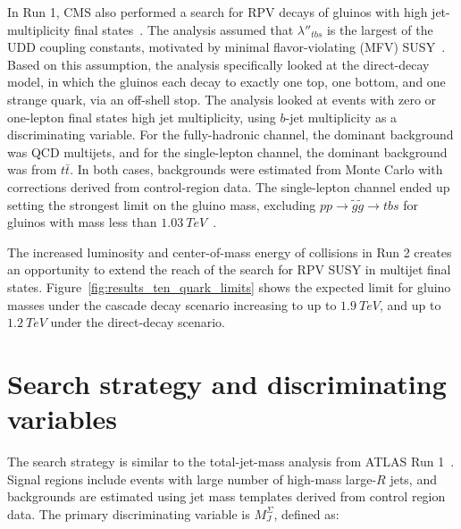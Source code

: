 In Run 1, CMS also performed a search for RPV decays of gluinos with high jet-multiplicity final states~\cite{analysis-cms-run1}.
The analysis assumed that $\lambda''_{tbs}$ is the largest of the UDD coupling constants, motivated by minimal flavor-violating (MFV) SUSY~\cite{susy-mfv}.
Based on this assumption, the analysis specifically looked at the direct-decay model, in which the gluinos each decay to exactly one top, one bottom, and one strange quark, via an off-shell stop.
The analysis looked at events with zero or one-lepton final states high jet multiplicity, using $b$-jet multiplicity as a discriminating variable\cite{analysis-cms-run1}.
For the fully-hadronic channel, the dominant background was QCD multijets, and for the single-lepton channel, the dominant background was from $t\bar{t}$.
In both cases, backgrounds were estimated from Monte Carlo with corrections derived from control-region data.
The single-lepton channel ended up setting the strongest limit on the gluino mass, excluding $pp\rightarrow\tilde{g}\tilde{g}\rightarrow tbs$ for gluinos with mass less than $1.03~TeV$~\cite{analysis-cms-run1}.

The increased luminosity and center-of-mass energy of collisions in Run 2 creates an opportunity to extend the reach of the search for RPV SUSY in multijet final states.
Figure~\ref{fig:results_ten_quark_limits} shows the expected limit for gluino masses under the cascade decay scenario increasing to up to $1.9~TeV$, and up to $1.2~TeV$ under the direct-decay scenario.

\section{Search strategy and discriminating variables}\label{sec:search_strategy}

The search strategy is similar to the total-jet-mass analysis from ATLAS Run 1~\cite{run1-multijet}.
Signal regions include events with large number of high-mass large-$R$ jets, and backgrounds are estimated using jet mass templates derived from control region data.
The primary discriminating variable is $M_{J}^{\Sigma}$, defined as:

